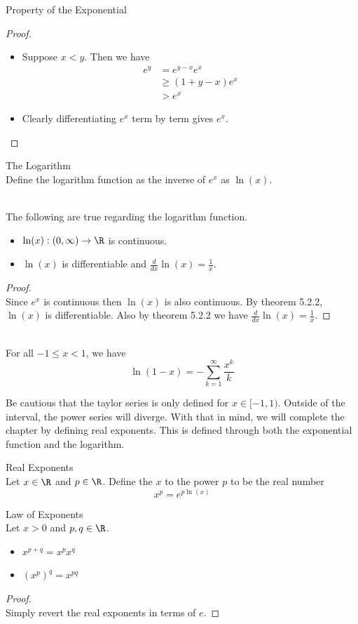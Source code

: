 \documentclass[a4paper]{article}
\begin{document}
\begin{prp}{Property of the Exponential}{}
\begin{proof}
\begin{itemize}
\item Suppose $x<y$. Then we have
\begin{align*}
e^y&=e^{y-x}e^x\\
&\geq(1+y-x)e^x\\
&>e^x
\end{align*}
\item Clearly differentiating $e^x$ term by term gives $e^x$. 
\end{itemize}
\end{proof}
\end{prp}

\begin{defn}{The Logarithm}{}\\ Define the logarithm function as the inverse of $e^x$ as $\ln(x)$. 
\end{defn}

\begin{prp}{}{}\\
The following are true regarding the logarithm function. 
\begin{itemize}
\item $\ln(x):(0,\infty)\to\R$ is continuous. 
\item $\ln(x)$ is differentiable and $\frac{d}{dx}\ln(x)=\frac{1}{x}$. 
\end{itemize}
\begin{proof}\\ Since $e^x$ is continuous then $\ln(x)$ is also continuous. By theorem 5.2.2, $\ln(x)$ is differentiable. Also by theorem 5.2.2 we have $\frac{d}{dx}\ln(x)=\frac{1}{x}$. 
\end{proof}
\end{prp}

\begin{prp}{}{}\\
For all $-1\leq x<1$, we have $$\ln(1-x)=-\sum_{k=1}^\infty\frac{x^k}{k}$$
\end{prp}

Be cautious that the taylor series is only defined for $x\in[-1,1)$. Outside of the interval, the power series will diverge. With that in mind, we will complete the chapter by defining real exponents. This is defined through both the exponential function and the logarithm. 

\begin{defn}{Real Exponents}{}\\
Let $x\in\R$ and $p\in\R$. Define the $x$ to the power $p$ to be the real number $$x^p=e^{p\ln(x)}$$
\end{defn}

\begin{prp}{Law of Exponents}{}\\ Let $x>0$ and $p,q\in\R$. 
\begin{itemize}
\item $x^{p+q}=x^px^q$
\item $(x^p)^q=x^{pq}$
\end{itemize}
\begin{proof}\\ Simply revert the real exponents in terms of $e$. 
\end{proof}
\end{prp}
\end{document}
